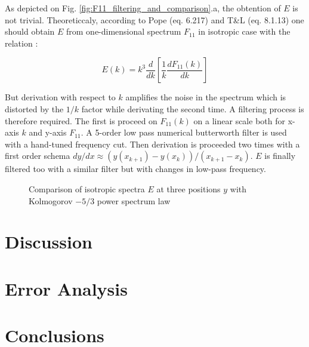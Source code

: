 \documentclass[12pt]{article}
\begin{document}
As depicted on Fig. \ref{fig:F11_filtering_and_comparison}.a, the obtention of $E$ is not trivial. Theoreticcaly, according to Pope (eq. 6.217) and T\&L (eq. 8.1.13) one should obtain $E$
 from one-dimensional spectrum $F_{11}$ in isotropic case with the relation :
 
 \begin{equation}
     E(k) = k^3 \frac{d}{dk} \left[ \frac{1}{k} \frac{dF_{11}(k)}{dk} \right]
 \end{equation}
 
 But derivation with respect to $k$ amplifies the noise in the spectrum which is distorted by the $1/k$ factor while derivating the second time. A filtering process is therefore required. The first is proceed on $F_{11}(k)$ on a linear scale both for x-axis $k$ and y-axis $F_{11}$. A 5-order low pass numerical butterworth filter is used with a hand-tuned frequency cut. Then derivation is proceeded two times with a first order schema $dy/dx \approx (y(x_{k+1})-y(x_k))/(x_{k+1}-x_k)$. $E$ is finally filtered too with a similar filter but with changes in low-pass frequency.\\
 
 
 
\begin{figure}
    \centering
    \resizebox{0.6\linewidth}{!}{}
    \caption{Comparison of isotropic spectra $E$ at three positions $y$ with Kolmogorov $-5/3$ power spectrum law}
    \label{fig:F_comparison}
\end{figure}

\section{Discussion}

\section{Error Analysis}

\section{Conclusions}

\newpage


\end{document}
